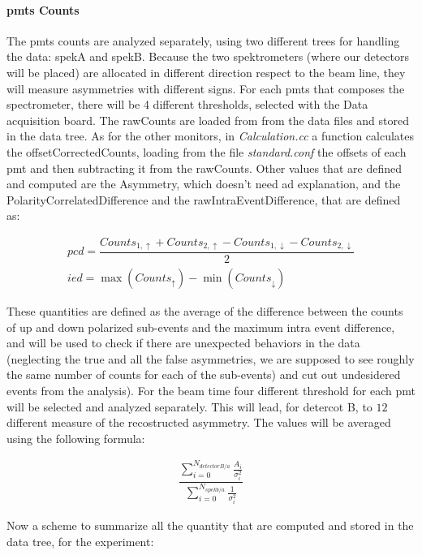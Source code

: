 \documentclass[10pt,a4paper]{article}
\begin{document}
\paragraph{pmts Counts}

The pmts counts are analyzed separately, using two different trees for handling the data: spekA and spekB. Because the two spektrometers (where our detectors will be placed) are allocated in different direction respect to the beam line, they will measure asymmetries with different signs. For each pmts that composes the spectrometer, there will be 4 different thresholds, selected with the Data acquisition board. The rawCounts are loaded from from the data files and stored in the data tree. As for the other monitors, in \textit{Calculation.cc} a function calculates the offsetCorrectedCounts, loading from the file \textit{standard.conf} the offsets of each pmt and then subtracting it from the rawCounts. Other values that are defined and computed are the Asymmetry, which doesn't need ad explanation, and the PolarityCorrelatedDifference and the rawIntraEventDifference, that are defined as:


\begin{gather*}
 pcd = \dfrac{Counts_{1,\uparrow} + Counts_{2,\uparrow} - Counts_{1,\downarrow} - Counts_{2,\downarrow}}{2} \\
 ied = \max (Counts_{\uparrow}) - \min (Counts_{\downarrow})
\end{gather*}

These quantities are defined as the average of the difference between the counts of up and down polarized sub-events and the maximum intra event difference, and will be used to check if there are unexpected behaviors in the data (neglecting the true and all the false asymmetries, we are supposed to see roughly the same number of counts for each of the sub-events) and cut out undesidered events from the analysis). 
For the beam time four different threshold for each pmt will be selected and analyzed separately. This will lead, for detercot B, to $12$ different measure of the recostructed asymmetry. The values will be averaged using the following formula:

\begin{align*}
	\dfrac{\sum_{i = 0}^{N_{detectorB/a}} \frac{A_{i}}{\sigma_{i}^{2}}}{\sum_{i = 0}^{N_{spekb/a}} \frac{1}{\sigma_{i}^{2}}}
\end{align*}

Now a scheme to summarize all the quantity that are computed and stored in the data tree, for the experiment: \newpage
\end{document}
